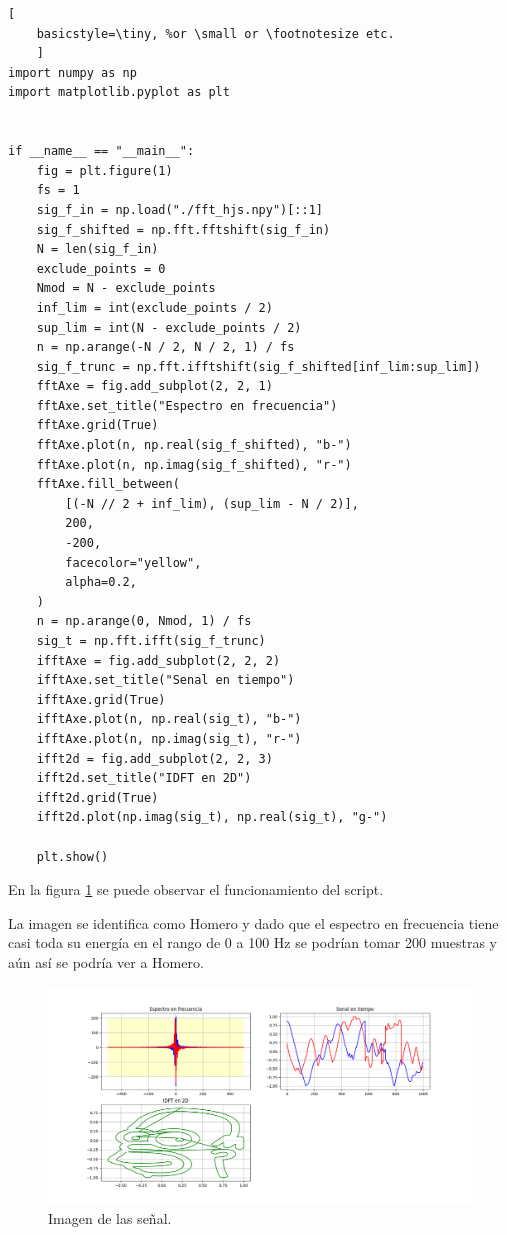 \documentclass[
    11pt,
    spanish,
	a4paper
]{article}
\begin{document}
\begin{lstlisting}[
    basicstyle=\tiny, %or \small or \footnotesize etc.
    ]
import numpy as np
import matplotlib.pyplot as plt


if __name__ == "__main__":
    fig = plt.figure(1)
    fs = 1
    sig_f_in = np.load("./fft_hjs.npy")[::1]
    sig_f_shifted = np.fft.fftshift(sig_f_in)
    N = len(sig_f_in)
    exclude_points = 0
    Nmod = N - exclude_points
    inf_lim = int(exclude_points / 2)
    sup_lim = int(N - exclude_points / 2)
    n = np.arange(-N / 2, N / 2, 1) / fs
    sig_f_trunc = np.fft.ifftshift(sig_f_shifted[inf_lim:sup_lim])
    fftAxe = fig.add_subplot(2, 2, 1)
    fftAxe.set_title("Espectro en frecuencia")
    fftAxe.grid(True)
    fftAxe.plot(n, np.real(sig_f_shifted), "b-")
    fftAxe.plot(n, np.imag(sig_f_shifted), "r-")
    fftAxe.fill_between(
        [(-N // 2 + inf_lim), (sup_lim - N / 2)],
        200,
        -200,
        facecolor="yellow",
        alpha=0.2,
    )
    n = np.arange(0, Nmod, 1) / fs
    sig_t = np.fft.ifft(sig_f_trunc)
    ifftAxe = fig.add_subplot(2, 2, 2)
    ifftAxe.set_title("Senal en tiempo")
    ifftAxe.grid(True)
    ifftAxe.plot(n, np.real(sig_t), "b-")
    ifftAxe.plot(n, np.imag(sig_t), "r-")
    ifft2d = fig.add_subplot(2, 2, 3)
    ifft2d.set_title("IDFT en 2D")
    ifft2d.grid(True)
    ifft2d.plot(np.imag(sig_t), np.real(sig_t), "g-")

    plt.show()
\end{lstlisting}

En la figura \ref{fig:ifdt} se puede observar el funcionamiento del script.

La imagen se identifica como Homero y dado que el espectro en frecuencia tiene casi toda su energía en el rango de 0 a 100 Hz se podrían tomar 200 muestras y aún así se podría ver a Homero.

\begin{figure}[htbp]
	\centering
	\includegraphics[width=\textwidth]{img/homero.png}
	\caption{Imagen de las señal.}
	\label{fig:ifdt}
\end{figure}
\end{document}
